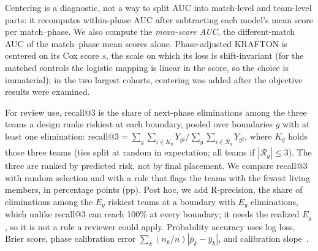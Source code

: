 \documentclass[sigconf,anonymous]{acmart}
\begin{document}
Centering is a diagnostic, not a way to split AUC into match-level and team-level parts: it recomputes within-phase AUC after subtracting each model's mean score per match--phase. We also compute the \emph{mean-score AUC}, the different-match AUC of the match--phase mean scores alone. Phase-adjusted KRAFTON is centered on its Cox score $s$, the scale on which its loss is shift-invariant (for the matched controls the logistic mapping is linear in the score, so the choice is immaterial); in the two largest cohorts, centering was added after the objective results were examined.

For review use, recall@3 is the share of next-phase eliminations among the three teams a design ranks riskiest at each boundary, pooled over boundaries $g$ with at least one elimination: $\mathrm{recall@3}=\sum_g\sum_{i\in K_g}Y_{gi}\big/\sum_g\sum_{i\in\mathcal{R}_g}Y_{gi}$, where $K_g$ holds those three teams (ties split at random in expectation; all teams if $|\mathcal{R}_g|\le3$). The three are ranked by predicted risk, not by final placement. We compare recall@3 with random selection and with a rule that flags the teams with the fewest living members, in percentage points (pp). Post hoc, we add R-precision, the share of eliminations among the $E_g$ riskiest teams at a boundary with $E_g$ eliminations, which unlike recall@3 can reach 100\% at every boundary; it needs the realized $E_g$, so it is not a rule a reviewer could apply. Probability accuracy uses log loss, Brier score, phase calibration error $\sum_k(n_k/n)|\bar p_k-\bar y_k|$, and calibration slope~\cite{VanCalster16}.
\end{document}
